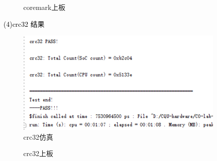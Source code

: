 \begin{figure}[htbp]
    \centering
    \caption{coremark上板}
\end{figure}


\textcolor{black}{(4)crc32 结果}\\
\begin{figure}[htbp]
    \centering
    \includegraphics[width=0.9\textwidth]{image/crc32S.png}
    \caption{crc32仿真}
\end{figure}

\begin{figure}[htbp]
    \centering
    \caption{crc32上板}
\end{figure}

